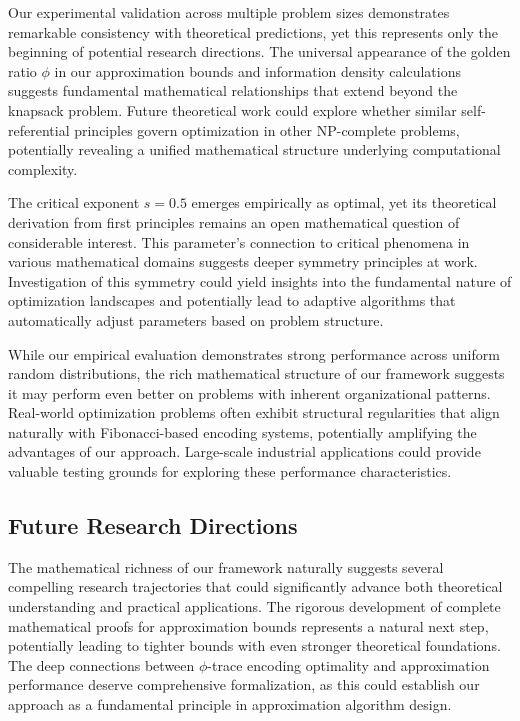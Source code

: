 \documentclass[11pt]{article}
\theoremstyle{remark}
\theoremstyle{definition}
\begin{document}
Our experimental validation across multiple problem sizes demonstrates remarkable consistency with theoretical predictions, yet this represents only the beginning of potential research directions. The universal appearance of the golden ratio $\phi$ in our approximation bounds and information density calculations suggests fundamental mathematical relationships that extend beyond the knapsack problem. Future theoretical work could explore whether similar self-referential principles govern optimization in other NP-complete problems, potentially revealing a unified mathematical structure underlying computational complexity.

The critical exponent $s = 0.5$ emerges empirically as optimal, yet its theoretical derivation from first principles remains an open mathematical question of considerable interest. This parameter's connection to critical phenomena in various mathematical domains suggests deeper symmetry principles at work. Investigation of this symmetry could yield insights into the fundamental nature of optimization landscapes and potentially lead to adaptive algorithms that automatically adjust parameters based on problem structure.

While our empirical evaluation demonstrates strong performance across uniform random distributions, the rich mathematical structure of our framework suggests it may perform even better on problems with inherent organizational patterns. Real-world optimization problems often exhibit structural regularities that align naturally with Fibonacci-based encoding systems, potentially amplifying the advantages of our approach. Large-scale industrial applications could provide valuable testing grounds for exploring these performance characteristics.

\subsection{Future Research Directions}

The mathematical richness of our framework naturally suggests several compelling research trajectories that could significantly advance both theoretical understanding and practical applications. The rigorous development of complete mathematical proofs for approximation bounds represents a natural next step, potentially leading to tighter bounds with even stronger theoretical foundations. The deep connections between $\phi$-trace encoding optimality and approximation performance deserve comprehensive formalization, as this could establish our approach as a fundamental principle in approximation algorithm design.
\end{document}

